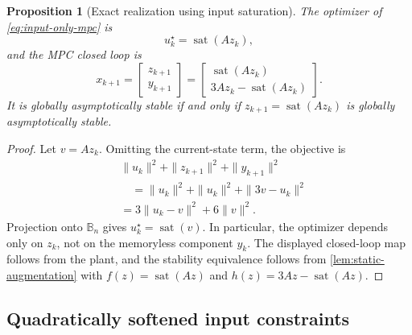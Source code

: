 \documentclass{IEEEtran}
\newtheorem{proposition}[theorem]{Proposition}
\theoremstyle{remark}
\newcommand{\B}{\mathbb{B}}
\newcommand{\sat}{\operatorname{sat}}
\begin{document}
\begin{proposition}[Exact realization using input saturation]
\label{prop:input-only}
The optimizer of \eqref{eq:input-only-mpc} is
\[
  u_k^\star=\sat(Az_k),
\]
and the MPC closed loop is
\[
  x_{k+1}=\begin{bmatrix}z_{k+1}\\y_{k+1}\end{bmatrix}
  =
  \begin{bmatrix}
    \sat(Az_k)\\
    3Az_k-\sat(Az_k)
  \end{bmatrix}.
\]
It is globally asymptotically stable if and only if
$z_{k+1}=\sat(Az_k)$ is globally asymptotically stable.
\end{proposition}

\begin{proof}
Let $v=Az_k$.  Omitting the current-state term, the objective is
\begin{align*}
  &\|u_k\|^2+\|z_{k+1}\|^2+\|y_{k+1}\|^2\\
  &\quad=\|u_k\|^2+\|u_k\|^2+\|3v-u_k\|^2\\
  &=3\|u_k-v\|^2+6\|v\|^2.
\end{align*}
Projection onto $\B_n$ gives $u_k^\star=\sat(v)$.  In particular, the
optimizer depends only on $z_k$, not on the memoryless component $y_k$.
The displayed closed-loop map follows from the plant, and the stability
equivalence follows from \cref{lem:static-augmentation} with
$f(z)=\sat(Az)$ and $h(z)=3Az-\sat(Az)$.
\end{proof}

\subsection{Quadratically softened input constraints}
\label{sec:soft-input}
\end{document}

